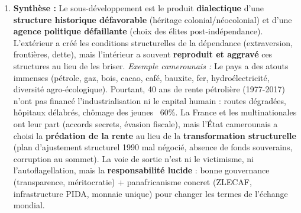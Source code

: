\documentclass[11pt]{article}
\begin{document}
\begin{corrige}
\begin{enumerate}
\item \textbf{Synthèse :} Le sous-développement est le produit \textbf{dialectique} d'une \textbf{structure historique défavorable} (héritage colonial/néocolonial) et d'une \textbf{agence politique défaillante} (choix des élites post-indépendance). L'extérieur a créé les conditions structurelles de la dépendance (extraversion, frontières, dette), mais l'intérieur a souvent \textbf{reproduit et aggravé} ces structures au lieu de les briser. \textit{Exemple camerounais :} Le pays a des atouts immenses (pétrole, gaz, bois, cacao, café, bauxite, fer, hydroélectricité, diversité agro-écologique). Pourtant, 40 ans de rente pétrolière (1977-2017) n'ont pas financé l'industrialisation ni le capital humain : routes dégradées, hôpitaux délabrés, chômage des jeunes ~60\%. La France et les multinationales ont leur part (accords secrets, évasion fiscale), mais l'État camerounais a choisi la \textbf{prédation de la rente} au lieu de la \textbf{transformation structurelle} (plan d'ajustement structurel 1990 mal négocié, absence de fonds souverains, corruption au sommet). La voie de sortie n'est ni le victimisme, ni l'autoflagellation, mais la \textbf{responsabilité lucide} : bonne gouvernance (transparence, méritocratie) + panafricanisme concret (ZLECAF, infrastructure PIDA, monnaie unique) pour changer les termes de l'échange mondial.
\end{enumerate}
\end{corrige}
\end{document}
